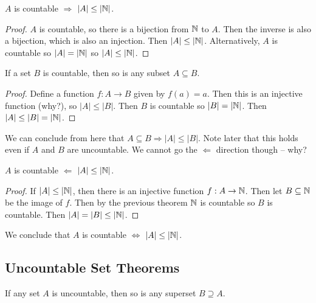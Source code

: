 \documentclass[main.tex]{subfiles}
\begin{document}
\begin{thm}
	\(A\) is countable \(\Rightarrow\) \(|A| \leq |\mathbb{N}|\).
\end{thm}

\begin{proof}
	\(A\) is countable, so there is a bijection from \(\mathbb{N}\) to \(A\). Then the inverse is also a bijection, which is also an injection. Then \(|A| \leq |\mathbb{N}|\). Alternatively, \(A\) is countable so \(|A| = |\mathbb{N}|\) so \(|A| \leq |\mathbb{N}|\).
\end{proof}

\begin{thm}
	If a set \(B\) is countable, then so is any subset \(A \subseteq B\).
\end{thm}

\begin{proof}
	Define a function \(f : A \rightarrow B\) given by \(f(a) = a\). Then this is an injective function (why?), so \(|A| \leq |B|\). Then \(B\) is countable so \(|B| = |\mathbb{N}|\). Then \(|A| \leq |B| = |\mathbb{N}|\).
\end{proof}

\begin{rem}
	We can conclude from here that \(A \subseteq B \Rightarrow |A| \leq |B|\).
	Note later that this holds even if \(A\) and \(B\) are uncountable.
	We cannot go the \(\Leftarrow\) direction though -- why?
\end{rem}

\begin{thm}
	\(A\) is countable \(\Leftarrow\) \(|A| \leq |\mathbb{N}|\).
\end{thm}

\begin{proof}
	If \(|A| \leq |\mathbb{N}|\), then there is an injective function \(f : A \rightarrow \mathbb{N}\). Then let \(B \subseteq \mathbb{N}\) be the image of \(f\). Then by the previous theorem \(\mathbb{N}\) is countable so \(B\) is countable. Then \(|A| = |B| \leq |\mathbb{N}|\).
\end{proof}

\begin{rem}
	We conclude that \(A\) is countable \(\Leftrightarrow\) \(|A| \leq |\mathbb{N}|\).
\end{rem}

\subsection{Uncountable Set Theorems}

\begin{thm}
	If any set \(A\) is uncountable, then so is any superset \(B \supseteq A\).
\end{thm}
\end{document}
